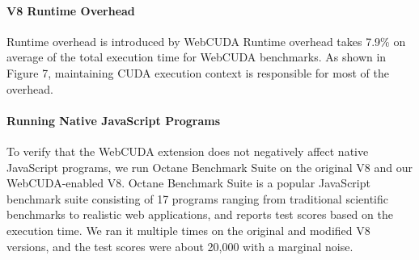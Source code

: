 \paragraph{V8 Runtime Overhead}
Runtime overhead is introduced by WebCUDA Runtime overhead takes 7.9\% on average of the total execution time for WebCUDA benchmarks. As shown in Figure 7, maintaining CUDA execution context is responsible for most of the overhead.

\paragraph{Running Native JavaScript Programs}
To verify that the WebCUDA extension does not negatively affect native JavaScript programs, we run Octane Benchmark Suite on the original V8 and our WebCUDA-enabled V8. Octane Benchmark Suite is a popular JavaScript benchmark suite consisting of 17 programs ranging from traditional scientific benchmarks to realistic web applications, and reports test scores based on the execution time. We ran it multiple times on the original and modified V8 versions, and the test scores were about 20,000
with a marginal noise.
